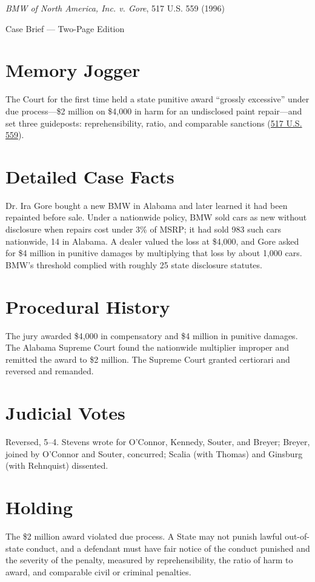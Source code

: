 \documentclass[12pt]{article}
\begin{document}
\begin{center}
{\LARGE \textit{BMW of North America, Inc. v. Gore}, 517 U.S. 559 (1996)\par}
\vspace{0.5em}
{\large Case Brief --- Two-Page Edition\par}
\end{center}

\section{Memory Jogger}
The Court for the first time held a state punitive award ``grossly excessive'' under due process---\$2 million on \$4,000 in harm for an undisclosed paint repair---and set three guideposts: reprehensibility, ratio, and comparable sanctions (\href{https://www.courtlistener.com/opinion/118026/bmw-of-north-america-inc-v-gore/}{517 U.S. 559}).

\section{Detailed Case Facts}
Dr. Ira Gore bought a new BMW in Alabama and later learned it had been repainted before sale. Under a nationwide policy, BMW sold cars as new without disclosure when repairs cost under 3\% of MSRP; it had sold 983 such cars nationwide, 14 in Alabama. A dealer valued the loss at \$4,000, and Gore asked for \$4 million in punitive damages by multiplying that loss by about 1,000 cars. BMW's threshold complied with roughly 25 state disclosure statutes.

\section{Procedural History}
The jury awarded \$4,000 in compensatory and \$4 million in punitive damages. The Alabama Supreme Court found the nationwide multiplier improper and remitted the award to \$2 million. The Supreme Court granted certiorari and reversed and remanded.

\section{Judicial Votes}
Reversed, 5--4. Stevens wrote for O'Connor, Kennedy, Souter, and Breyer; Breyer, joined by O'Connor and Souter, concurred; Scalia (with Thomas) and Ginsburg (with Rehnquist) dissented.

\section{Holding}
The \$2 million award violated due process. A State may not punish lawful out-of-state conduct, and a defendant must have fair notice of the conduct punished and the severity of the penalty, measured by reprehensibility, the ratio of harm to award, and comparable civil or criminal penalties.
\end{document}
